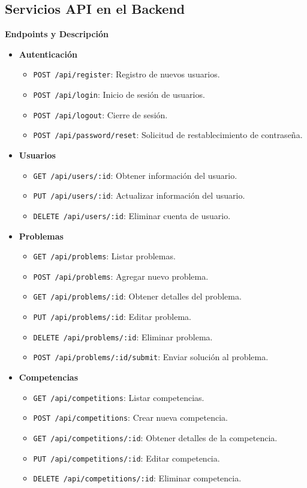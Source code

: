 \subsection{Servicios API en el Backend}

\textbf{Endpoints y Descripción}

\begin{itemize}
    \item \textbf{Autenticación}
    \begin{itemize}
        \item \texttt{POST /api/register}: Registro de nuevos usuarios.
        \item \texttt{POST /api/login}: Inicio de sesión de usuarios.
        \item \texttt{POST /api/logout}: Cierre de sesión.
        \item \texttt{POST /api/password/reset}: Solicitud de restablecimiento de contraseña.
    \end{itemize}

    \item \textbf{Usuarios}
    \begin{itemize}
        \item \texttt{GET /api/users/:id}: Obtener información del usuario.
        \item \texttt{PUT /api/users/:id}: Actualizar información del usuario.
        \item \texttt{DELETE /api/users/:id}: Eliminar cuenta de usuario.
    \end{itemize}

    \item \textbf{Problemas}
    \begin{itemize}
        \item \texttt{GET /api/problems}: Listar problemas.
        \item \texttt{POST /api/problems}: Agregar nuevo problema.
        \item \texttt{GET /api/problems/:id}: Obtener detalles del problema.
        \item \texttt{PUT /api/problems/:id}: Editar problema.
        \item \texttt{DELETE /api/problems/:id}: Eliminar problema.
        \item \texttt{POST /api/problems/:id/submit}: Enviar solución al problema.
    \end{itemize}

    \item \textbf{Competencias}
    \begin{itemize}
        \item \texttt{GET /api/competitions}: Listar competencias.
        \item \texttt{POST /api/competitions}: Crear nueva competencia.
        \item \texttt{GET /api/competitions/:id}: Obtener detalles de la competencia.
        \item \texttt{PUT /api/competitions/:id}: Editar competencia.
        \item \texttt{DELETE /api/competitions/:id}: Eliminar competencia.
    \end{itemize}


\end{itemize}
